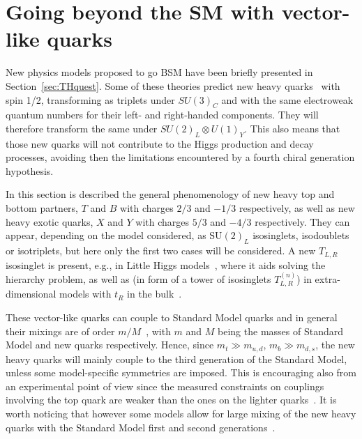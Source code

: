 
\newpage
\section{Going beyond the SM with vector-like quarks}\label{sec:THvlq}

New physics models proposed to go BSM have been briefly presented in
Section~\ref{sec:THquest}. Some of these theories predict new heavy
quarks~\cite{AguilarSaavedra:2009es} %
with spin 1/2, transforming as triplets under $SU(3)_C$ and 
 with the same electroweak quantum numbers for their 
left- and right-handed components. They will
therefore transform the same under 
$SU(2)_L\otimes U(1)_Y$. 
This also means that those new quarks will not
contribute to the Higgs production and decay 
processes, avoiding then the
limitations encountered by a fourth chiral generation hypothesis.

In this section is described the general phenomenology of new heavy top and bottom
partners, $T$ and $B$ with charges $2/3$ and $-1/3$ respectively, as
well as new heavy exotic quarks, $X$ and $Y$ with charges $5/3$ and 
$-4/3$ respectively. They can appear, depending on the model considered,
as  $\text{SU}(2)_L$ isosinglets, isodoublets or isotriplets, but here
only the first two cases will be considered. 
A new $T_{L,R}$ isosinglet is present, e.g., in 
Little Higgs models~\cite{ArkaniHamed:2001nc,Perelstein:2005ka}, 
where it aids solving the hierarchy problem, as well
as (in form of a tower of isosinglets $T_{L,R}^{(n)}$) 
in extra-dimensional models with $t_R$ 
in the bulk~\cite{Csaki:2004ay}. 

These vector-like quarks can couple to Standard Model quarks and
in general their mixings are of order $m/M$~\cite{delAguila:1982fs},
 with $m$ and $M$ being
the masses of Standard Model and new quarks respectively.
Hence, since $m_t \gg m_{u,d}$, $m_b \gg m_{d,s}$,
the new heavy quarks will mainly couple to the third
generation of the Standard Model, unless some model-specific
symmetries are imposed.
This is encouraging also from an experimental point of view
since the measured constraints on couplings involving the
top quark are weaker than the ones on the lighter 
quarks~\cite{delAguila:1998tp,AguilarSaavedra:2002kr}.
It is worth noticing that however some models allow for 
large mixing of the new heavy quarks with the Standard Model
first and second generations~\cite{Atre:2008iu}.

